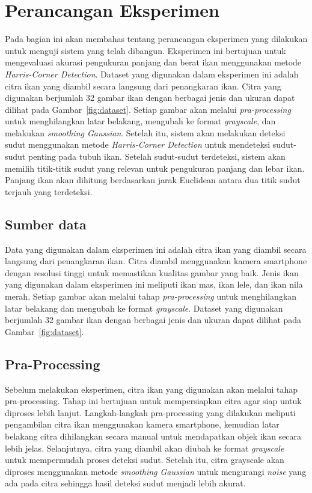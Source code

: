     \section{Perancangan Eksperimen}
   Pada bagian ini akan membahas tentang perancangan eksperimen yang dilakukan untuk menguji sistem yang telah dibangun. Eksperimen ini bertujuan untuk mengevaluasi akurasi pengukuran panjang dan berat ikan menggunakan metode \emph{Harris-Corner Detection}.
   Dataset yang digunakan dalam eksperimen ini adalah citra ikan yang diambil secara langsung dari penangkaran ikan.
   Citra yang digunakan berjumlah 32 gambar ikan dengan berbagai jenis dan ukuran dapat dilihat pada Gambar~\ref{fig:dataset}.
   Setiap gambar akan melalui \emph{pra-processing} untuk menghilangkan latar belakang, mengubah ke format \emph{grayscale}, dan melakukan \emph{smoothing Gaussian}.
   Setelah itu, sistem akan melakukan deteksi sudut menggunakan metode \emph{Harris-Corner Detection} untuk mendeteksi sudut-sudut penting pada tubuh ikan.
   Setelah sudut-sudut terdeteksi, sistem akan memilih titik-titik sudut yang relevan untuk pengukuran panjang dan lebar ikan.
   Panjang ikan akan dihitung berdasarkan jarak Euclidean antara dua titik sudut terjauh yang terdeteksi.

\subsection{Sumber data}
    Data yang digunakan dalam eksperimen ini adalah citra ikan yang diambil secara langsung dari penangkaran ikan. Citra diambil menggunakan kamera smartphone dengan resolusi tinggi untuk memastikan kualitas gambar yang baik.
Jenis ikan yang digunakan dalam eksperimen ini meliputi ikan mas, ikan lele, dan ikan nila merah. Setiap gambar akan melalui tahap \emph{pra-processing} untuk menghilangkan latar belakang dan mengubah ke format \emph{grayscale}. Dataset yang digunakan berjumlah 32 gambar ikan dengan berbagai jenis dan ukuran dapat dilihat pada Gambar~\ref{fig:dataset}.

\subsection{Pra-Processing}
    Sebelum melakukan eksperimen, citra ikan yang digunakan akan melalui tahap pra-processing. 
Tahap ini bertujuan untuk mempersiapkan citra agar siap untuk diproses lebih lanjut. 
Langkah-langkah pra-processing yang dilakukan meliputi pengambilan citra ikan menggunakan kamera smartphone, kemudian latar belakang citra dihilangkan secara manual untuk mendapatkan objek ikan secara lebih jelas. 
Selanjutnya, citra yang diambil akan diubah ke format \emph{grayscale} untuk mempermudah proses deteksi sudut. 
Setelah itu, citra grayscale akan diproses menggunakan metode \emph{smoothing Gaussian} untuk mengurangi \emph{noise} yang ada pada citra sehingga hasil deteksi sudut menjadi lebih akurat.


